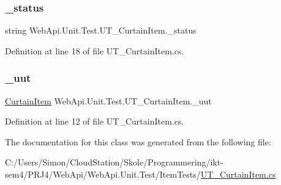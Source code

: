 \subsubsection{\texorpdfstring{\+\_\+status}{\_status}}
{\footnotesize\ttfamily string Web\+Api.\+Unit.\+Test.\+U\+T\+\_\+\+Curtain\+Item.\+\_\+status\hspace{0.3cm}{\ttfamily [private]}}



Definition at line 18 of file U\+T\+\_\+\+Curtain\+Item.\+cs.

\mbox{\label{class_web_api_1_1_unit_1_1_test_1_1_u_t___curtain_item_aa1d1e95f506d62a30bb3be63cac96bda}} 
\subsubsection{\texorpdfstring{\+\_\+uut}{\_uut}}
{\footnotesize\ttfamily \mbox{\hyperlink{class_f_w_p_s_1_1_models_1_1_curtain_item}{Curtain\+Item}} Web\+Api.\+Unit.\+Test.\+U\+T\+\_\+\+Curtain\+Item.\+\_\+uut\hspace{0.3cm}{\ttfamily [private]}}



Definition at line 12 of file U\+T\+\_\+\+Curtain\+Item.\+cs.



The documentation for this class was generated from the following file\+:\begin{DoxyCompactItemize}
\item 
C\+:/\+Users/\+Simon/\+Cloud\+Station/\+Skole/\+Programmering/ikt-\/sem4/\+P\+R\+J4/\+Web\+Api/\+Web\+Api.\+Unit.\+Test/\+Item\+Tests/\mbox{\hyperlink{_u_t___curtain_item_8cs}{U\+T\+\_\+\+Curtain\+Item.\+cs}}\end{DoxyCompactItemize}
